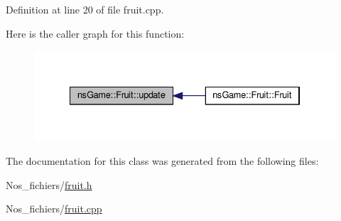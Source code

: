 Definition at line 20 of file fruit.\+cpp.

Here is the caller graph for this function\+:\nopagebreak
\begin{figure}[H]
\begin{center}
\leavevmode
\includegraphics[width=334pt]{classns_game_1_1_fruit_adade5568e2f552576d0d32b714b9ac02_icgraph}
\end{center}
\end{figure}


The documentation for this class was generated from the following files\+:\begin{DoxyCompactItemize}
\item 
Nos\+\_\+fichiers/\hyperlink{fruit_8h}{fruit.\+h}\item 
Nos\+\_\+fichiers/\hyperlink{fruit_8cpp}{fruit.\+cpp}\end{DoxyCompactItemize}

